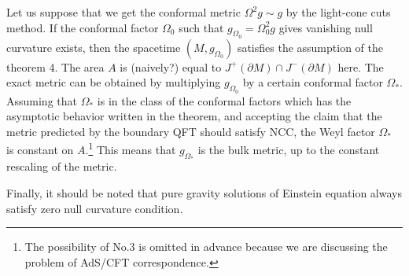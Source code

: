 \documentclass[12pt]{article}
\begin{document}
Let us suppose that we get the conformal metric $\Omega^2 g \sim g$ by the light-cone cuts method.
If the conformal factor $\Omega_0$ such that $g_{\Omega_0} = \Omega_0^2 g$ gives vanishing null curvature exists, 
then the spacetime $(M,g_{\Omega_0})$ satisfies the assumption of the theorem 4.
The area $A$ is (naively?) equal to $J^+(\partial M)\cap J^-(\partial M)$ here.
The exact metric can be obtained by multiplying $g_{\Omega_0}$ by a certain conformal factor $\Omega_\ast$.
Assuming that $\Omega_\ast$ is in the class of the conformal factors which has the asymptotic behavior written in the theorem,
 and accepting the claim that the metric predicted by the boundary QFT should satisfy NCC, 
 the Weyl factor $\Omega_\ast$ is constant on $A$.\footnote{
The possibility of No.3 is omitted in advance because we are discussing the problem of AdS/CFT correspondence.
}
This means that $g_{\Omega_\ast}$ is the bulk metric, up to the constant rescaling of the metric.

Finally, it should be noted that pure gravity solutions of Einstein equation always satisfy zero null curvature condition.

 

\end{document}
